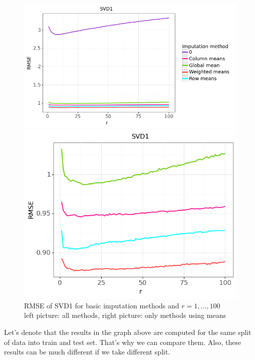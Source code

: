 \documentclass[10pt]{amsart}
\begin{document}
\begin{figure}[H]
\centering
\begin{minipage}{.63\textwidth}
  \centering
  \includegraphics[width=\textwidth]{svd1_1}
\end{minipage}%
\begin{minipage}{.4\textwidth}
  \centering
  \includegraphics[width=\textwidth]{svd1_2}
\end{minipage}
\caption{RMSE of SVD1 for basic imputation methods and $r = 1, \dots, 100$ \\
left picture: all methods, right picture: only methods using means}
\end{figure}

Let's denote that the results in the graph above are computed for the same split of data into train and test set.
That's why we can compare them.
Also, these results can be much different if we take different split.
\end{document}
